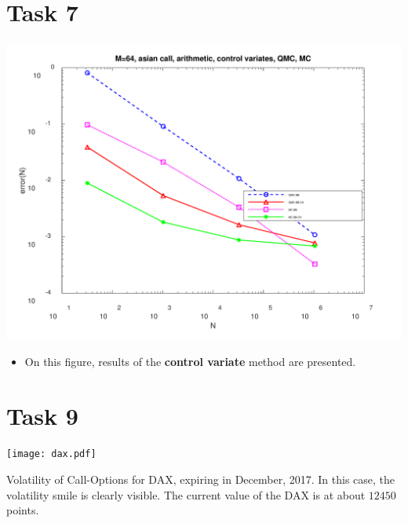 \documentclass[10pt,a4paper]{article}
\begin{document}
\section*{Task 7}


\begin{center}
	\includegraphics[scale=0.25]{images/task7_error.png}
\end{center}
\begin{itemize}
    \item{
        On this figure, results of the \textbf{control variate}
        method are presented. 
    }
\end{itemize}

\section*{Task 9}

\begin{center}
	\texttt{[image: dax.pdf]}
\end{center}

Volatility of Call-Options for DAX, expiring in December, 2017. In this case, the volatility smile is clearly visible. The current value of the DAX is at about $12450$ points. 
\end{document}
